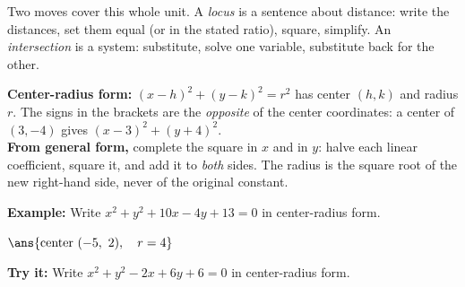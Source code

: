 \documentclass[12pt]{article}
\begin{document}

\noindent\small Two moves cover this whole unit. A \emph{locus} is a sentence
about distance: write the distances, set them equal (or in the stated ratio),
square, simplify. An \emph{intersection} is a system: substitute, solve one
variable, substitute back for the other.
\normalsize

\begin{formulabox}
\textbf{Center-radius form:} $(x-h)^2 + (y-k)^2 = r^2$ has center $(h, k)$ and
radius $r$. The signs in the brackets are the \emph{opposite} of the center
coordinates: a center of $(3, -4)$ gives $(x-3)^2 + (y+4)^2$.\\[3pt]
\textbf{From general form,} complete the square in $x$ and in $y$: halve each
linear coefficient, square it, and add it to \emph{both} sides. The radius is
the square root of the new right-hand side, never of the original constant.
\end{formulabox}
\begin{examplebox}
\textbf{Example:} Write $x^2 + y^2 + 10x - 4y + 13 = 0$ in center-radius form.
\par
$\ans{\text{center } (-5,\ 2), \quad r = 4}$
\end{examplebox}
\begin{tryitbox}
\textbf{Try it:} Write $x^2 + y^2 - 2x + 6y + 6 = 0$ in center-radius
form.\\[2pt]
\end{tryitbox}
\end{document}
